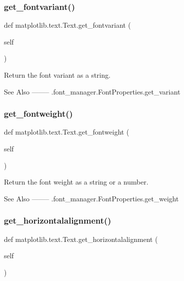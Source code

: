 \subsubsection{\texorpdfstring{get\+\_\+fontvariant()}{get\_fontvariant()}}
{\footnotesize\ttfamily def matplotlib.\+text.\+Text.\+get\+\_\+fontvariant (\begin{DoxyParamCaption}\item[{}]{self }\end{DoxyParamCaption})}

\begin{DoxyVerb}Return the font variant as a string.

See Also
--------
.font_manager.FontProperties.get_variant
\end{DoxyVerb}
 \mbox{\label{classmatplotlib_1_1text_1_1Text_a353750be1b61b1b1b56876afdffcec91}} 
\subsubsection{\texorpdfstring{get\+\_\+fontweight()}{get\_fontweight()}}
{\footnotesize\ttfamily def matplotlib.\+text.\+Text.\+get\+\_\+fontweight (\begin{DoxyParamCaption}\item[{}]{self }\end{DoxyParamCaption})}

\begin{DoxyVerb}Return the font weight as a string or a number.

See Also
--------
.font_manager.FontProperties.get_weight
\end{DoxyVerb}
 \mbox{\label{classmatplotlib_1_1text_1_1Text_afcf6c05ce2d0696a760b6c9c6964f3e2}} 
\subsubsection{\texorpdfstring{get\+\_\+horizontalalignment()}{get\_horizontalalignment()}}
{\footnotesize\ttfamily def matplotlib.\+text.\+Text.\+get\+\_\+horizontalalignment (\begin{DoxyParamCaption}\item[{}]{self }\end{DoxyParamCaption})}

